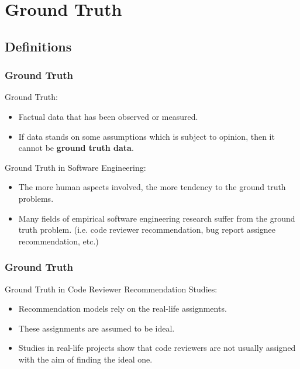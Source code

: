 \documentclass{beamer}
\begin{document}
\section{Ground Truth}
\subsection{Definitions}
\begin{frame}
\frametitle{\large Ground Truth}

    \begin{block}{Ground Truth:}
    \begin{itemize}
        \item Factual data that has been observed or measured.
        \item If data stands on some assumptions which is subject to opinion, then it cannot be \textbf{ground truth data}.
    \end{itemize}    
    \end{block}
    \pause
    \begin{block}{Ground Truth in Software Engineering:}
    \begin{itemize}
    \item The more human aspects involved, the more tendency to the ground truth problems.
    \item Many fields of empirical software engineering research suffer from the ground truth problem. (i.e. code reviewer recommendation, bug report assignee recommendation, etc.)   
    \end{itemize}    
    \end{block}    
\end{frame}


\begin{frame}
\frametitle{\large Ground Truth}

    \begin{block}{Ground Truth in Code Reviewer Recommendation Studies:}
    \begin{itemize}
        \item Recommendation models rely on the real-life assignments.
        \item These assignments are assumed to be ideal.
        \item Studies in real-life projects show that code reviewers are not usually assigned with the aim of finding the ideal one.
    \end{itemize}    
    \end{block}

\end{frame}
\end{document}
